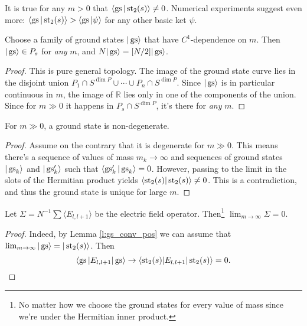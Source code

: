 \begin{conj}
It is true for any $m > 0$ that $\langle \operatorname{gs}|\operatorname{st}_2(s)\rangle \neq 0$. Numerical experiments suggest even more: $\langle \operatorname{gs} | \operatorname{st}_2(s)\rangle > \langle \operatorname{gs} | \psi \rangle$ for any other basic ket $\psi$.
\end{conj}

\begin{proposition}
Choose a family of ground states $|\operatorname{gs}\rangle$ that have $C^1$-dependence on $m$. Then $|\operatorname{gs}\rangle \in P_s$ for \emph{any} $m$, and $N|\operatorname{gs}\rangle = [N/2] |\operatorname{gs}\rangle$.
\end{proposition}
\begin{proof}
This is pure general topology. The image of the ground state curve lies in the disjoint union $P_1 \cap S^{\dim P} \cup \cdots \cup P_n \cap S^{\dim P}$. Since $|\operatorname{gs}\rangle$ is in particular continuous in $m$, the image of $\mathbb R$ lies only in one of the components of the union. Since for $m \gg 0$ it happens in $P_s\cap S^{\dim P}$, it's there for \emph{any} $m$.
\end{proof}

\begin{proposition}
For $m \gg 0$, a ground state is non-degenerate.
\end{proposition}
\begin{proof}
Assume on the contrary that it is degenerate for $m \gg 0$. This means there's a sequence of values of mass $m_k \rightarrow \infty$ and sequences of ground states $|\operatorname{gs}_k\rangle$ and $|\operatorname{gs}^\prime_k\rangle$ such that $\langle\operatorname{gs}_k^\prime|\operatorname{gs}_k\rangle = 0$. However, passing to the limit in the slots of the Hermitian product yields $\langle \operatorname{st}_2(s) | \operatorname{st}_2(s) \rangle \neq 0$. This is a contradiction, and thus the ground state is unique for large $m$.
\end{proof}

\begin{proposition}
Let $\Sigma = N^{-1}\sum \langle E_{l,l+1} \rangle$ be the electric field operator. Then\footnote{No matter how we choose the ground states for every value of mass since we're under the Hermitian inner product.} $\lim_{m \rightarrow \infty} \Sigma = 0$.
\end{proposition}
\begin{proof}
Indeed, by Lemma \ref{l:gs_conv_pos} we can assume that $\lim_{m \rightarrow \infty} |\operatorname{gs}\rangle = |\operatorname{st}_2(s)\rangle$. Then 
\[
\langle \operatorname{gs} | E_{l,l+1} | \operatorname{gs} \rangle \rightarrow \langle \operatorname{st}_2(s) | E_{l,l+1}|\operatorname{st}_2(s)\rangle = 0.\qedhere
\]
\end{proof}

